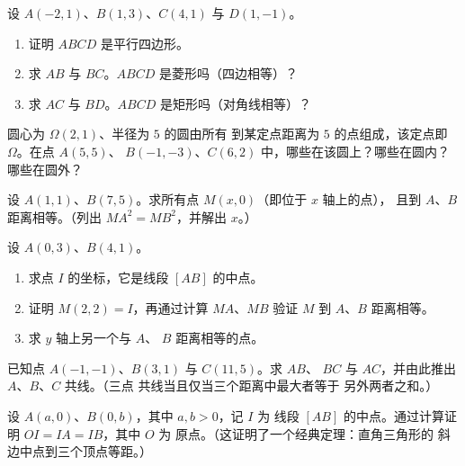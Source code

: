\begin{exercise}[$\star\star$]\label{exo:g10:coordgeom:5}
设 $A(-2, 1)$、$B(1, 3)$、$C(4, 1)$ 与 $D(1, -1)$。
\begin{enumerate}
  \item 证明 $ABCD$ 是平行四边形。
  \item 求 $AB$ 与 $BC$。$ABCD$ 是菱形吗（四边相等）？
  \item 求 $AC$ 与 $BD$。$ABCD$ 是矩形吗（对角线相等）？
\end{enumerate}
\end{exercise}

\begin{exercise}[$\star\star$]\label{exo:g10:coordgeom:6}
圆心为 $\Omega(2, 1)$、半径为 $5$ 的圆由所有
到某定点距离为 $5$ 的点组成，该定点即 $\Omega$。在点 $A(5, 5)$、
$B(-1, -3)$、$C(6, 2)$ 中，哪些在该圆上？哪些在圆内？哪些在圆外？
\end{exercise}

\begin{exercise}[$\star\star$]\label{exo:g10:coordgeom:7}
设 $A(1, 1)$、$B(7, 5)$。求所有点 $M(x, 0)$（即位于 $x$ 轴上的点），
且到 $A$、$B$ 距离相等。（列出 $MA^2 = MB^2$，并解出
$x$。）
\end{exercise}

\begin{exercise}[$\star\star$]\label{exo:g10:coordgeom:8}
设 $A(0, 3)$、$B(4, 1)$。
\begin{enumerate}
  \item 求点 $I$ 的坐标，它是线段 $[AB]$ 的中点。
  \item 证明 $M(2, 2) = I$，再通过计算 $MA$、$MB$
        验证 $M$ 到 $A$、$B$ 距离相等。
  \item 求 $y$ 轴上另一个与 $A$、
        $B$ 距离相等的点。
\end{enumerate}
\end{exercise}

\begin{exercise}[$\star\star$]\label{exo:g10:coordgeom:9}
已知点 $A(-1, -1)$、$B(3, 1)$ 与 $C(11, 5)$。求 $AB$、
$BC$ 与 $AC$，并由此推出 $A$、$B$、$C$ 共线。（三点
共线当且仅当三个距离中最大者等于
另外两者之和。）
\end{exercise}

\begin{exercise}[$\star\star\star$]\label{exo:g10:coordgeom:10}
设 $A(a, 0)$、$B(0, b)$，其中 $a, b > 0$，记 $I$ 为
线段 $[AB]$ 的中点。通过计算证明 $OI = IA = IB$，其中 $O$ 为
原点。（这证明了一个经典定理：直角三角形的
斜边中点到三个顶点等距。）
\end{exercise}

